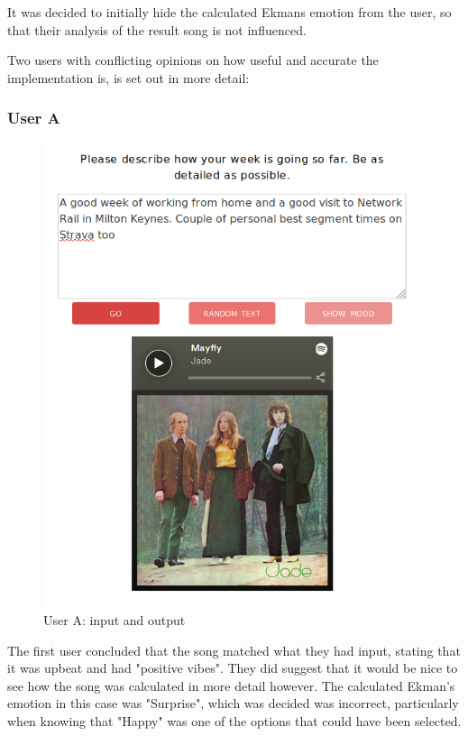 It was decided to initially hide the calculated Ekmans emotion from the user, so that their analysis of the result song is not influenced. 

Two users with conflicting opinions on how useful and accurate the implementation is, is set out in more detail:

\subsubsection{User A}

\begin{figure}[h]
\centering
\includegraphics[scale=0.4]{implementation/malc-user.png}
\caption{User A: input and output}
\label{user:1}
\end{figure}

The first user concluded that the song matched what they had input, stating that it was upbeat and had "positive vibes". They did suggest that it would be nice to see how the song was calculated in more detail however. The calculated Ekman's emotion in this case was "Surprise", which was decided was incorrect, particularly when knowing that "Happy" was one of the options that could have been selected.

